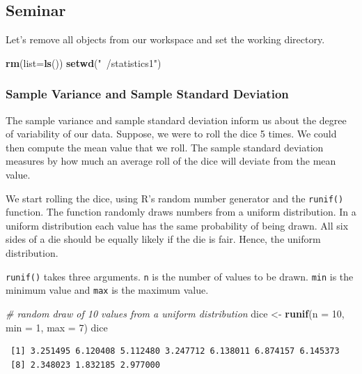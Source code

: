 \documentclass[]{article}
\newenvironment{Shaded}{\begin{snugshade}}{\end{snugshade}}
\newcommand{\KeywordTok}[1]{\textcolor[rgb]{0.13,0.29,0.53}{\textbf{#1}}}
\newcommand{\DataTypeTok}[1]{\textcolor[rgb]{0.13,0.29,0.53}{#1}}
\newcommand{\DecValTok}[1]{\textcolor[rgb]{0.00,0.00,0.81}{#1}}
\newcommand{\StringTok}[1]{\textcolor[rgb]{0.31,0.60,0.02}{#1}}
\newcommand{\CommentTok}[1]{\textcolor[rgb]{0.56,0.35,0.01}{\textit{#1}}}
\newcommand{\NormalTok}[1]{#1}
\theoremstyle{definition}
\theoremstyle{definition}
\theoremstyle{definition}
\theoremstyle{remark}
\begin{document}
\subsection{Seminar}\label{seminar-4}

Let's remove all objects from our workspace and set the working
directory.

\begin{Shaded}
\begin{Highlighting}[]
\KeywordTok{rm}\NormalTok{(}\DataTypeTok{list=}\KeywordTok{ls}\NormalTok{())}
\KeywordTok{setwd}\NormalTok{(}\StringTok{"~/statistics1"}\NormalTok{)}
\end{Highlighting}
\end{Shaded}

\subsubsection{Sample Variance and Sample Standard
Deviation}\label{sample-variance-and-sample-standard-deviation}

The sample variance and sample standard deviation inform us about the
degree of variability of our data. Suppose, we were to roll the dice 5
times. We could then compute the mean value that we roll. The sample
standard deviation measures by how much an average roll of the dice will
deviate from the mean value.

We start rolling the dice, using R's random number generator and the
\texttt{runif()} function. The function randomly draws numbers from a
uniform distribution. In a uniform distribution each value has the same
probability of being drawn. All six sides of a die should be equally
likely if the die is fair. Hence, the uniform distribution.

\texttt{runif()} takes three arguments. \texttt{n} is the number of
values to be drawn. \texttt{min} is the minimum value and \texttt{max}
is the maximum value.

\begin{Shaded}
\begin{Highlighting}[]
\CommentTok{# random draw of 10 values from a uniform distribution}
\NormalTok{dice <-}\StringTok{ }\KeywordTok{runif}\NormalTok{(}\DataTypeTok{n =} \DecValTok{10}\NormalTok{, }\DataTypeTok{min =} \DecValTok{1}\NormalTok{, }\DataTypeTok{max =} \DecValTok{7}\NormalTok{)}
\NormalTok{dice}
\end{Highlighting}
\end{Shaded}

\begin{verbatim}
 [1] 3.251495 6.120408 5.112480 3.247712 6.138011 6.874157 6.145373
 [8] 2.348023 1.832185 2.977000
\end{verbatim}
\end{document}
